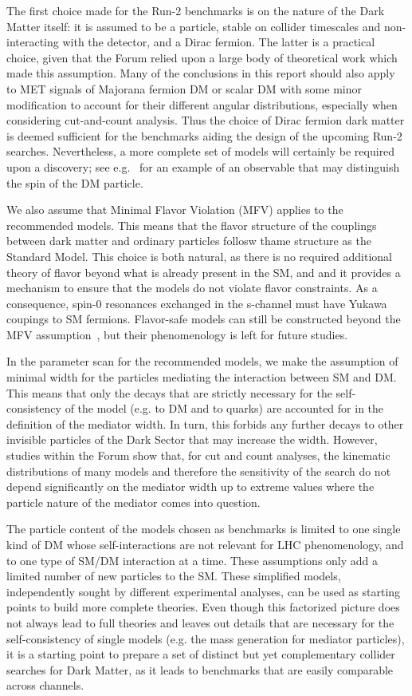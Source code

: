 The first choice made for the Run-2 benchmarks is on the nature of the
Dark Matter itself: it is assumed to be a particle, stable on collider
timescales and non-interacting with the detector, and a Dirac fermion.
The latter is a practical choice, given that the Forum relied upon a
large body of theoretical work which made this assumption. Many of the
conclusions in this report should also apply to MET signals of
Majorana fermion DM or scalar DM with some minor modification to
account for their different angular distributions, especially when
considering cut-and-count analysis. Thus the choice of Dirac fermion
dark matter is deemed sufficient for the benchmarks aiding the design
of the upcoming Run-2 searches. Nevertheless, a more complete set of
models will certainly be required upon a discovery; see
e.g.~\cite{Crivellin:2015wva} for an example of an observable that may
distinguish the spin of the DM particle.

We also assume that Minimal Flavor Violation (MFV) applies to the
recommended models. This means that the flavor structure of the
couplings between dark matter and ordinary particles follosw thame
structure as the Standard Model. This choice is both natural, as there
is no required additional theory of flavor beyond what is already
present in the SM, and and it provides a mechanism to ensure that the
models do not violate flavor constraints.  As a consequence, spin-0
resonances exchanged in the s-channel must have Yukawa coupings to SM
fermions. Flavor-safe models can still be constructed beyond the MFV
assumption~\cite{Agrawal:2014aoa}, but their phenomenology is left for
future studies.

In the parameter scan for the recommended models, we make the
assumption of minimal width for the particles mediating the
interaction between SM and DM.  This means that only the decays that
are strictly necessary for the self-consistency of the model (e.g.  to
DM and to quarks) are accounted for in the definition of the mediator
width. In turn, this forbids any further decays to other invisible
particles of the Dark Sector that may increase the width. However,
studies within the Forum show that, for cut and count analyses, the
kinematic distributions of many models and therefore the sensitivity
of the search do not depend significantly on the mediator width up to
extreme values where the particle nature of the mediator comes into
question.

The particle content of the models chosen as benchmarks is limited to
one single kind of DM whose self-interactions are not relevant for LHC
phenomenology, and to one type of SM/DM interaction at a time. These
assumptions only add a limited number of new particles to the
SM. These simplified models, independently sought by different
experimental analyses, can be used as starting points to build more
complete theories. Even though this factorized picture does not always
lead to full theories and leaves out details that are necessary for
the self-consistency of single models (e.g. the mass generation for
mediator particles), it is a starting point to prepare a set of
distinct but yet complementary collider searches for Dark Matter, as
it leads to benchmarks that are easily comparable across channels.
